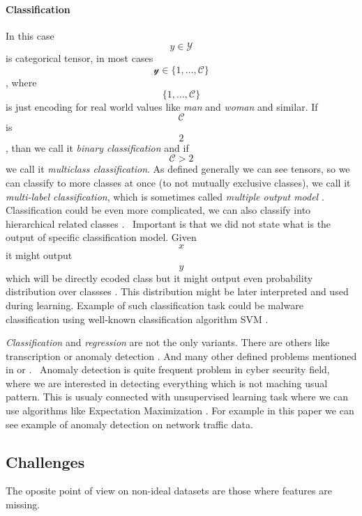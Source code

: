 \paragraph{Classification}
In this case $$y \in \mathcal{Y}$$ is categorical tensor, in most cases $$\mathcal{y} \in \{1,\dots,\mathcal{C}\}$$, where $$\{1,\dots,\mathcal{C}\}$$ is just encoding for real world values like \emph{man} and \emph{woman} and similar. If $$\mathcal{C}$$ is $$2$$, than we call it \emph{binary classification} and if $$\mathcal{C}>2$$ we call it \emph{multiclass classification}. As defined generally we can see tensors, so we can classify to more classes at once (to not mutually exclusive classes), we call it \emph{multi-label classification}, which is sometimes called \emph{multiple output model} \cite{murphy2013machine}. Classification could be even more complicated, we can also classify into hierarchical related classes \cite{zhang2020dive}. \
Important is that we did not state what is the output of specific classification model. Given $$x$$ it might output $$\hat{y}$$ which will be directly ecoded class but it might output even probability distribution over classses \cite{GoodBengCour16}. This distribution might be later interpreted and used during learning.
Example of such classification task could be malware classification using well-known classification algorithm SVM \cite{Kruczkowski2014}.


\emph{Classification} and \emph{regression} are not the only variants. There are others like transcription \cite{GoodBengCour16} or anomaly detection \cite{Chandola2009}. And many other defined problems mentioned in \cite{GoodBengCour16} or \cite{zhang2020dive}. \
Anomaly detection is quite frequent problem in cyber security field, where we are interested in detecting everything which is not maching usual pattern. This is usualy connected with unsupervised learning task where we can use algorithms like Expectation Maximization \cite{Dempster1977}. For example in this paper \cite{IglesiasVazquez2014} we can see example of anomaly detection on network traffic data.

\subsection{Challenges}
The oposite point of view on non-ideal datasets are those where features are missing. 

